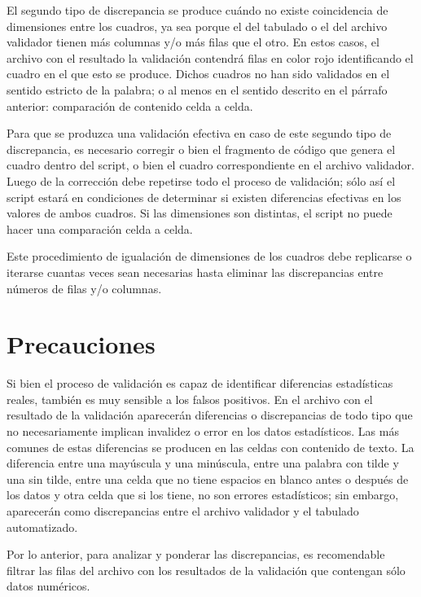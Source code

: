 \documentclass[
  spanish,
]{book}
\begin{document}
El segundo tipo de discrepancia se produce cuándo no existe coincidencia de dimensiones entre los cuadros, ya sea porque el del tabulado o el del archivo validador tienen más columnas y/o más filas que el otro. En estos casos, el archivo con el resultado la validación contendrá filas en color rojo identificando el cuadro en el que esto se produce. Dichos cuadros no han sido validados en el sentido estricto de la palabra; o al menos en el sentido descrito en el párrafo anterior: comparación de contenido celda a celda.

Para que se produzca una validación efectiva en caso de este segundo tipo de discrepancia, es necesario corregir o bien el fragmento de código que genera el cuadro dentro del script, o bien el cuadro correspondiente en el archivo validador. Luego de la corrección debe repetirse todo el proceso de validación; sólo así el script estará en condiciones de determinar si existen diferencias efectivas en los valores de ambos cuadros. Si las dimensiones son distintas, el script no puede hacer una comparación celda a celda.

Este procedimiento de igualación de dimensiones de los cuadros debe replicarse o iterarse cuantas veces sean necesarias hasta eliminar las discrepancias entre números de filas y/o columnas.

\hypertarget{precauciones}{%
\section{Precauciones}\label{precauciones}}

Si bien el proceso de validación es capaz de identificar diferencias estadísticas reales, también es muy sensible a los falsos positivos. En el archivo con el resultado de la validación aparecerán diferencias o discrepancias de todo tipo que no necesariamente implican invalidez o error en los datos estadísticos. Las más comunes de estas diferencias se producen en las celdas con contenido de texto. La diferencia entre una mayúscula y una minúscula, entre una palabra con tilde y una sin tilde, entre una celda que no tiene espacios en blanco antes o después de los datos y otra celda que si los tiene, no son errores estadísticos; sin embargo, aparecerán como discrepancias entre el archivo validador y el tabulado automatizado.

Por lo anterior, para analizar y ponderar las discrepancias, es recomendable filtrar las filas del archivo con los resultados de la validación que contengan sólo datos numéricos.
\end{document}
